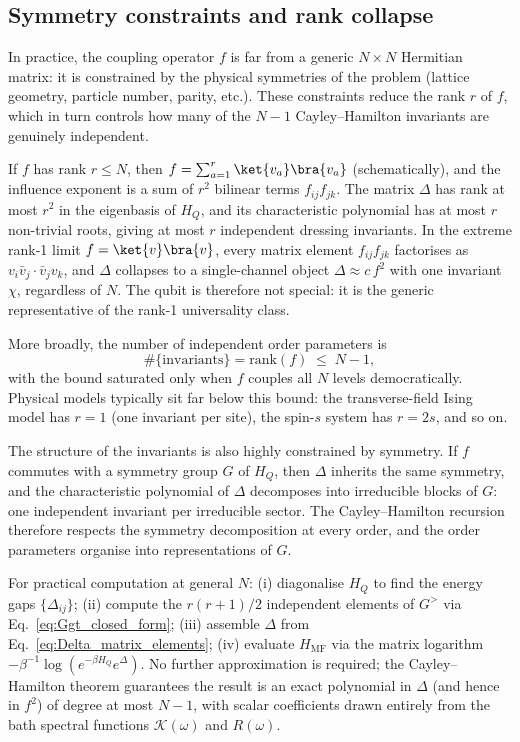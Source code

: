 \subsection{Symmetry constraints and rank collapse\label{subsec:symmetry_rank}}

In practice, the coupling operator $f$ is far from a generic $N\times N$ Hermitian matrix: it is
constrained by the physical symmetries of the problem (lattice geometry, particle number, parity,
etc.). These constraints reduce the rank $r$ of $f$, which in turn controls how many of the
$N-1$ Cayley--Hamilton invariants are genuinely independent.

If $f$ has rank $r\leq N$, then $f=\sum_{a=1}^r\ket{v_a}\bra{v_a}$ (schematically), and the
influence exponent is a sum of $r^2$ bilinear terms $f_{ij}f_{jk}$. The matrix $\Delta$ has rank
at most $r^2$ in the eigenbasis of $H_Q$, and its characteristic polynomial has at most $r$
non-trivial roots, giving at most $r$ independent dressing invariants. In the extreme rank-1 limit
$f=\ket{v}\bra{v}$, every matrix element $f_{ij}f_{jk}$ factorises as $v_i\bar v_j\cdot\bar v_j v_k$,
and $\Delta$ collapses to a single-channel object $\Delta\approx c\,f^2$ with one invariant $\chi$,
regardless of $N$. The qubit is therefore not special: it is the generic representative of the
rank-1 universality class.

More broadly, the number of independent order parameters is
\begin{equation}
    \#\{\text{invariants}\} = \mathrm{rank}(f)\;\leq\;N-1,
    \label{eq:n_invariants}
\end{equation}
with the bound saturated only when $f$ couples all $N$ levels democratically. Physical models
typically sit far below this bound: the transverse-field Ising model has $r=1$ (one invariant
per site), the spin-$s$ system has $r=2s$, and so on.

The structure of the invariants is also highly constrained by symmetry. If $f$ commutes with a
symmetry group $G$ of $H_Q$, then $\Delta$ inherits the same symmetry, and the characteristic
polynomial of $\Delta$ decomposes into irreducible blocks of $G$: one independent invariant per
irreducible sector. The Cayley--Hamilton recursion therefore respects the symmetry decomposition
at every order, and the order parameters organise into representations of $G$.

For practical computation at general $N$: (i) diagonalise $H_Q$ to find the energy gaps
$\{\Delta_{ij}\}$; (ii) compute the $r(r+1)/2$ independent elements of $G^{>}$ via
Eq.~\eqref{eq:Ggt_closed_form}; (iii) assemble $\Delta$ from Eq.~\eqref{eq:Delta_matrix_elements};
(iv) evaluate $H_{\mathrm{MF}}$ via the matrix logarithm $-\beta^{-1}\log(e^{-\beta H_Q}e^{\Delta})$.
No further approximation is required; the Cayley--Hamilton theorem guarantees the result is an
exact polynomial in $\Delta$ (and hence in $f^2$) of degree at most $N-1$, with scalar
coefficients drawn entirely from the bath spectral functions $\mathcal{K}(\omega)$ and $R(\omega)$.
